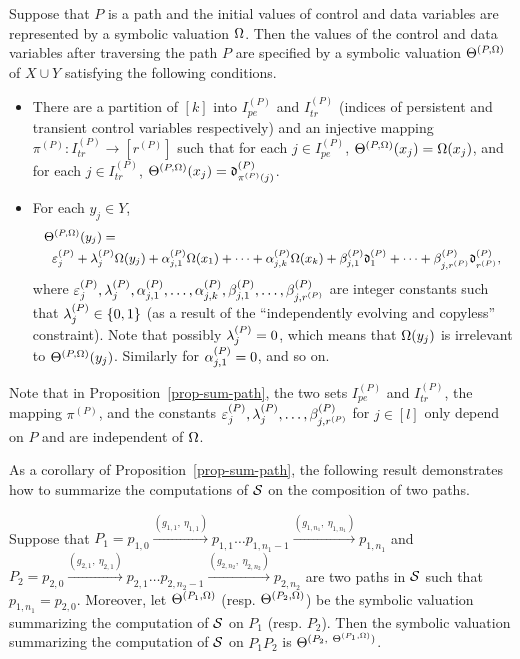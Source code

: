 \begin{proposition}\label{prop-sum-path}
Suppose that $P$ is a path and the initial values of control and data variables are represented by a symbolic valuation $\Omega$. Then the values of the control and data variables after traversing the path $P$ are specified by a symbolic valuation $\Theta^{(P,\Omega)}$ of $X \cup Y$ satisfying the following conditions.
\begin{itemize}
\item There are a partition of $[k]$ into $I^{(P)}_{pe}$ and $I^{(P)}_{tr}$ (indices of persistent and transient control variables respectively) and an injective mapping $\pi^{(P)}: I^{(P)}_{tr} \rightarrow [r^{(P)}]$ such that for each $j \in I^{(P)}_{pe}$, $\Theta^{(P,\Omega)}(x_j)=\Omega(x_j)$, and for each $j \in I^{(P)}_{tr}$, $\Theta^{(P,\Omega)}(x_j)=\mathfrak{d}^{(P)}_{\pi^{(P)}(j)}$.
% 
\item For each $y_j \in Y$, 
\[
\small
\begin{array}{l}
\smallskip
\sumf^{(P,\initval)}(y_j)  = \\
\hspace{2mm} \cste^{(P)}_{j} + \cstl^{(P)}_j \initval(y_j)  + \csta^{(P)}_{j,1} \initval(x_1) + \dots + \csta^{(P)}_{j,k} \initval(x_k) +  \cstb^{(P)}_{j,1} \vard^{(P)}_1 +\dots + \cstb^{(P)}_{j,r^{(P)}} \vard^{(P)}_{r^{(P)}},
\end{array}
\] 
where $\varepsilon^{(P)}_j,\lambda^{(P)}_j, \alpha^{(P)}_{j,1},\dots,\alpha^{(P)}_{j,k}, \beta^{(P)}_{j,1},\dots,\beta^{(P)}_{j,r^{(P)}}$ are integer constants such that $\lambda^{(P)}_{j} \in \{0,1\}$ (as a result of the ``independently evolving and copyless'' constraint). Note that possibly $\lambda^{(P)}_j =0$,  which means that $\Omega(y_j)$ is irrelevant to $\Theta^{(P,\Omega)}(y_j)$. Similarly for $\alpha^{(P)}_{j,1}=0$, and so on.
\end{itemize}
\end{proposition}
Note that in Proposition~\ref{prop-sum-path}, the two sets $I^{(P)}_{pe}$ and $I^{(P)}_{tr}$, the mapping $\pi^{(P)}$, and the constants $\varepsilon^{(P)}_j,\lambda^{(P)}_j, \dots, \beta^{(P)}_{j,r^{(P)}}$ for $j \in [l]$ only depend on $P$ and are independent of $\Omega$.

As a corollary of Proposition~\ref{prop-sum-path}, the following result demonstrates how to summarize the computations of ${\mathcal{S} }$ on the composition of two paths.

\begin{corollary}\label{cor-comp-two-paths}
Suppose that $P_1= p_{1,0} \xrightarrow{(g_{1,1},\ \eta_{1,1})} p_{1,1} \dots p_{1, n_1-1} \xrightarrow{(g_{1,n_1},\ \eta_{1,n_1})} p_{1,n_1}$ and $P_2=p_{2,0} \xrightarrow{(g_{2,1},\ \eta_{2,1})} p_{2,1} \dots p_{2, n_2-1} \xrightarrow{(g_{2,n_2},\ \eta_{2,n_2})} p_{2,n_2}$ are two paths in ${\mathcal{S} }$ such that $p_{1,n_1}=p_{2,0}$. Moreover, let $\Theta^{(P_1, \Omega)}$ (resp. $\Theta^{(P_2, \Omega)}$) be the symbolic valuation summarizing the computation of ${\mathcal{S} }$ on $P_1$ (resp. $P_2$). Then the symbolic valuation summarizing the computation of ${\mathcal{S} }$ on $P_1 P_2$ is $\sumf^{(P_2,\ \sumf^{(P_1,\initval)})}$.
\end{corollary}

